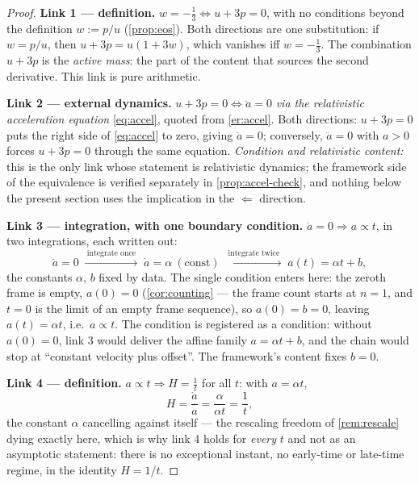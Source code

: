 \documentclass[11pt]{amsbook}
\theoremstyle{plain}
\theoremstyle{definition}
\theoremstyle{remark}
\begin{document}
\begin{proof}
\textbf{Link 1 --- definition.} $w = -\tfrac13 \Leftrightarrow u + 3p = 0$, with no conditions beyond the definition $w := p/u$ (\cref{prop:eos}). Both directions are one substitution: if $w = p/u$, then $u + 3p = u(1 + 3w)$, which vanishes iff $w = -\tfrac13$. The combination $u + 3p$ is the \emph{active mass}: the part of the content that sources the second derivative. This link is pure arithmetic.

\textbf{Link 2 --- external dynamics.} $u + 3p = 0 \Leftrightarrow \ddot a = 0$ \emph{via the relativistic acceleration equation} \cref{eq:accel}, quoted from \cref{er:accel}. Both directions: $u + 3p = 0$ puts the right side of \cref{eq:accel} to zero, giving $\ddot a = 0$; conversely, $\ddot a = 0$ with $a > 0$ forces $u + 3p = 0$ through the same equation. \emph{Condition and relativistic content:} this is the only link whose statement is relativistic dynamics; the framework side of the equivalence is verified separately in \cref{prop:accel-check}, and nothing below the present section uses the implication in the $\Leftarrow$ direction.

\textbf{Link 3 --- integration, with one boundary condition.} $\ddot a = 0 \Rightarrow a \propto t$, in two integrations, each written out:
\begin{equation}\label{eq:twice}
\ddot a = 0 \;\xrightarrow{\ \text{integrate once}\ }\; \dot a = \alpha \ (\text{const})
\;\xrightarrow{\ \text{integrate twice}\ }\; a(t) = \alpha t + b,
\end{equation}
the constants $\alpha$, $b$ fixed by data. The single condition enters here: the zeroth frame is empty, $a(0) = 0$ (\cref{cor:counting} --- the frame count starts at $n = 1$, and $t = 0$ is the limit of an empty frame sequence), so $a(0) = b = 0$, leaving $a(t) = \alpha t$, i.e.\ $a \propto t$. The condition is registered as a condition: without $a(0) = 0$, link 3 would deliver the affine family $a = \alpha t + b$, and the chain would stop at ``constant velocity plus offset''. The framework's content fixes $b = 0$.

\textbf{Link 4 --- definition.} $a \propto t \Rightarrow H = \tfrac1t$ for all $t$: with $a = \alpha t$,
\begin{equation}\label{eq:link4}
H = \frac{\dot a}{a} = \frac{\alpha}{\alpha t} = \frac{1}{t},
\end{equation}
the constant $\alpha$ cancelling against itself --- the rescaling freedom of \cref{rem:rescale} dying exactly here, which is why link 4 holds for \emph{every} $t$ and not as an asymptotic statement: there is no exceptional instant, no early-time or late-time regime, in the identity $H = 1/t$.


\end{proof}
\end{document}
